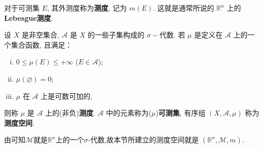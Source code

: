\documentclass[../../main.tex]{subfiles}
\begin{document}
\begin{definition}[Lebesgue测度]
对于可测集 \(E\), 其外测度称为\textbf{测度}, 记为 \(m(E)\). 这就是通常所说的 \(\mathbb{R}^n\) 上的 \textbf{Lebesgue测度}.
\end{definition}

\begin{definition}[测度]
设 \(X\) 是非空集合, \(\mathscr{A}\) 是 \(X\) 的一些子集构成的 \(\sigma -\)代数. 若 \(\mu\) 是定义在 \(\mathscr{A}\) 上的一个集合函数, 且满足：
\begin{enumerate}[(i)]
\item \(0 \leq \mu(E) \leq +\infty\) (\(E \in \mathscr{A}\));
\item \(\mu(\varnothing)=0\);
\item \(\mu\) 在 \(\mathscr{A}\) 上是可数可加的,
\end{enumerate}
则称 \(\mu\) 是 \(\mathscr{A}\) 上的(非负)\textbf{测度}. \(\mathscr{A}\) 中的元素称为(\(\mu\))\textbf{可测集}, 有序组 \((X, \mathscr{A}, \mu)\) 称为\textbf{测度空间}. 
\end{definition}
\begin{remark}
由可知$\mathscr{M}$就是$\mathbb{R}^n$上的一个$\sigma$-代数,故本节所建立的测度空间就是 \((\mathbb{R}^n, \mathscr{M}, m)\). 
\end{remark}
\end{document}
